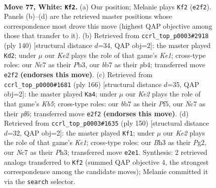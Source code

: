 \documentclass[11pt]{article}
\begin{document}
\clearpage

\begin{figure}[p]\centering
\begin{subfigure}{0.46\textwidth}\centering
\resizebox{\linewidth}{!}{%
\newchessgame
\chessboard[
  setfen={8/PbNR4/6k1/8/np3P2/6PB/4K2P/8 w - - 22 77},
  showmover=false,
  pgfstyle=straightmove, color=movearrow, markmove={e2-f2}
]}
\caption{}
\end{subfigure}\hfill
\begin{subfigure}{0.46\textwidth}\centering
\resizebox{\linewidth}{!}{%
\newchessgame
\chessboard[
  setfen={8/3n4/5k2/8/1pB2pP1/1P3P2/8/4K3 w - - 10 71},
  showmover=false,
  pgfstyle=straightmove, color=movearrow, markmove={e1-d2}
]}
\caption{}
\end{subfigure}
\\[4pt]
\begin{subfigure}{0.46\textwidth}\centering
\resizebox{\linewidth}{!}{%
\newchessgame
\chessboard[
  setfen={2B5/b7/3k1p1p/1K3P1P/2P5/8/8/8 w - - 9 84},
  showmover=false,
  pgfstyle=straightmove, color=movearrow, markmove={b5-a4}
]}
\caption{}
\end{subfigure}\hfill
\begin{subfigure}{0.46\textwidth}\centering
\resizebox{\linewidth}{!}{%
\newchessgame
\chessboard[
  setfen={8/b7/8/1P6/5pBp/3k3P/6P1/4K3 w - - 26 76},
  showmover=false,
  pgfstyle=straightmove, color=movearrow, markmove={e1-f1}
]}
\caption{}
\end{subfigure}
\caption{\textbf{Move 77, White: \texttt{Kf2}.} (a) Our position; Melanie plays \texttt{Kf2} (\texttt{e2f2}). Panels (b)--(d) are the retrieved master positions whose correspondence most drove this move (highest QAP objective among those that transfer to it). (b) Retrieved from \texttt{ccrl\_top\_p0003\#2918} (ply 140) [structural distance $d$=34, QAP obj=2]: the master played \texttt{Kd2}; under $\mu$ our \emph{Ke2} plays the role of that game's \emph{Ke1}; cross-type roles: our \emph{N}c7 as their \emph{P}b3, our \emph{b}b7 as their \emph{p}b4; transferred move \texttt{e2f2} \textbf{(endorses this move)}. (c) Retrieved from \texttt{ccrl\_top\_p0000\#1681} (ply 166) [structural distance $d$=35, QAP obj=2]: the master played \texttt{Ka4}; under $\mu$ our \emph{Ke2} plays the role of that game's \emph{Kb5}; cross-type roles: our \emph{b}b7 as their \emph{P}f5, our \emph{N}c7 as their \emph{p}f6; transferred move \texttt{e2f2} \textbf{(endorses this move)}. (d) Retrieved from \texttt{ccrl\_top\_p0003\#1635} (ply 150) [structural distance $d$=32, QAP obj=2]: the master played \texttt{Kf1}; under $\mu$ our \emph{Ke2} plays the role of that game's \emph{Ke1}; cross-type roles: our \emph{B}h3 as their \emph{P}g2, our \emph{N}c7 as their \emph{P}h3; transferred move \texttt{e2e1}. Synthesis: 2 retrieved analogs transferred to \texttt{Kf2} (summed QAP objective 4, the strongest correspondence among the candidate moves); Melanie committed it via the \texttt{search} selector.}
\label{fig:thought-m152}
\end{figure}
\end{document}
